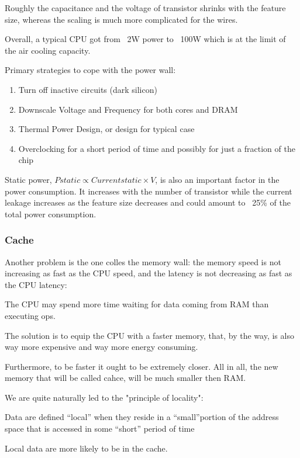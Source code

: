 Roughly the capacitance and the voltage of transistor shrinks with the feature size, whereas the scaling is much more complicated for the wires.

Overall, a typical CPU got from ~2W power to ~100W which is at the limit of the air cooling capacity.

Primary strategies to cope with the power wall:

\begin{enumerate}
    \item Turn off inactive circuits (dark silicon)
    \item Downscale Voltage and Frequency for both cores and DRAM
    \item Thermal Power Design, or design for typical case
    \item Overclocking for a short period of time and possibly for just a fraction of the chip
\end{enumerate}

Static power, $Pstatic \propto Currentstatic \times V$, is also an important factor in the power consumption. It increases with the number of transistor while the current leakage increases as the feature size decreases and could amount to ~25\% of the total power consumption.

\subsubsection{Cache}

Another problem is the one colles the memory wall: the memory speed is not increasing as fast as the CPU speed, and the latency is not decreasing as fast as the CPU latency:

The CPU may spend more time waiting for data coming from RAM than executing ops.

The solution is to equip the CPU with a faster memory, that, by the way, is also way more expensive and way more energy consuming.

Furthermore, to be faster it ought to be extremely closer. All in all, the new memory that will be called cahce, will be much smaller then RAM.

We are quite naturally led to the "principle of locality":

Data are defined “local” when they reside in a “small”portion of the address space that is accessed in some “short” period of time

Local data are more likely to be in the cache.

